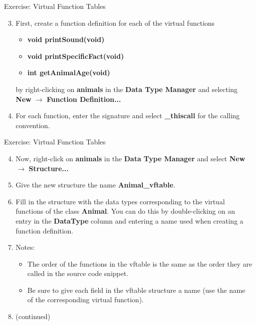 \documentclass{beamer}
\begin{document}
\begin{frame}
\begin{block}{Exercise: Virtual Function Tables}
\begin{enumerate}
\setcounter{enumi}{2}
\item First, create a function definition for each of the virtual functions 
\begin{itemize}
\item \textbf{void printSound(void)}
\item \textbf{void printSpecificFact(void)}
\item \textbf{int getAnimalAge(void)}
\end{itemize}
by right-clicking on \textbf{animals} in the \textbf{Data Type Manager} and selecting \textbf{New} $\rightarrow$ \textbf{Function Definition...} 
\item[] For each function, enter the signature and select \textbf{\_thiscall} for the calling convention. 
\end{enumerate}
\end{block}
\end{frame}

\begin{frame}
\begin{block}{Exercise: Virtual Function Tables}
\begin{enumerate}
\setcounter{enumi}{3}
\item Now, right-click on \textbf{animals} in the \textbf{Data Type Manager} and select \textbf{New} $\rightarrow$ \textbf{Structure...}
\item Give the new structure the name \textbf{Animal\_vftable}.
\item Fill in the structure with the data types corresponding to the virtual functions of the class \textbf{Animal}.  You can do this by double-clicking 
on an entry in the \textbf{DataType} column and entering a name used when creating a function definition.  
\item[] Notes:
\begin{itemize}
\item The order of the functions in the vftable is the same as the order they are called in the source code snippet.
\item Be sure to give each field in the vftable structure a name (use the name of the corresponding virtual function).
\end{itemize}
\item[] (continued)
\end{enumerate}
\end{block}
\end{frame}
\end{document}
